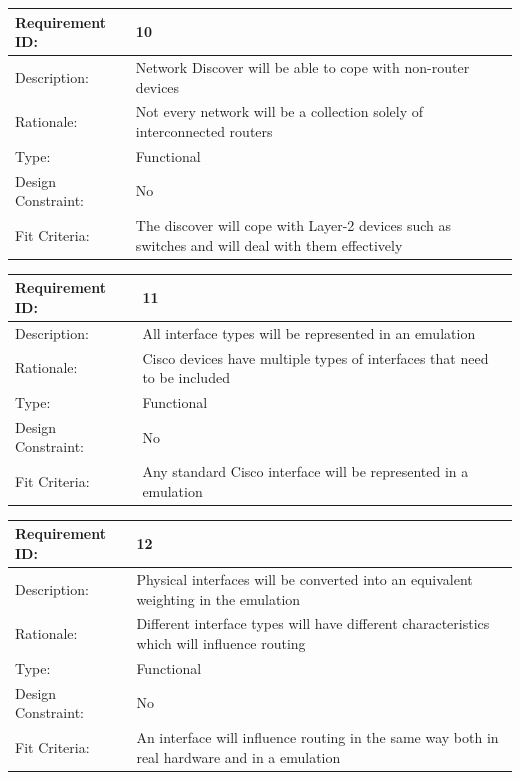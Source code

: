 \documentclass[11pt]{report}
\begin{document}
\newline
\vspace*{0.5 cm}
\newline
\begin{tabular}{|l|p{12cm}|}
	\hline Requirement ID: & 10 \\ 
	\hline Description: & Network Discover will be able to cope with non-router devices \\ 
	\hline Rationale: & Not every network will be a collection solely of interconnected routers \\ 
	\hline Type: & Functional \\ 
	\hline Design Constraint: & No \\ 
	\hline Fit Criteria: & The discover will cope with Layer-2 devices such as switches and will deal with them effectively \\ 
	\hline 
\end{tabular}
\newline
\vspace*{0.5 cm}
\newline
\begin{tabular}{|l|p{12cm}|}
	\hline Requirement ID: & 11 \\ 
	\hline Description: & All interface types will be represented in an emulation \\ 
	\hline Rationale: & Cisco devices have multiple types of interfaces that need to be included \\ 
	\hline Type: & Functional \\ 
	\hline Design Constraint: & No \\ 
	\hline Fit Criteria: & Any standard Cisco interface will be represented in a emulation \\ 
	\hline 
\end{tabular}
\newline
\vspace*{0.5 cm}
\newline
\begin{tabular}{|l|p{12cm}|}
	\hline Requirement ID: & 12 \\ 
	\hline Description: & Physical interfaces will be converted into an equivalent weighting in the emulation \\ 
	\hline Rationale: & Different interface types will have different characteristics which will influence routing \\ 
	\hline Type: & Functional \\ 
	\hline Design Constraint: & No \\ 
	\hline Fit Criteria: & An interface will influence routing in the same way both in real hardware and in a emulation \\ 
	\hline 
\end{tabular}
\end{document}
